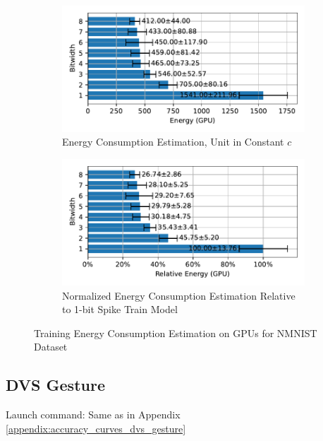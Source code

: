         \begin{figure}[H]
            \centering
            \begin{subfigure}[H]{0.6\textwidth}
                \includegraphics[width=\textwidth]{../standard/NMNIST/plots/nmnist_train_energy_gpu_horizontal.pdf}
                \caption{Energy Consumption Estimation, Unit in Constant $c$}
            \end{subfigure}
            \hfill
            \begin{subfigure}[H]{0.6\textwidth}
                \includegraphics[width=\textwidth]{../standard/NMNIST/plots/nmnist_train_relative_energy_gpu_horizontal.pdf}
                \caption{Normalized Energy Consumption Estimation Relative to 1-bit Spike Train Model}
            \end{subfigure}
            \caption{Training Energy Consumption Estimation on GPUs for NMNIST Dataset}
        \end{figure}

    \subsection{DVS Gesture}
    \label{appendix:energy_gpu_dvs_gesture}
        Launch command: Same as in Appendix \ref{appendix:accuracy_curves_dvs_gesture}

